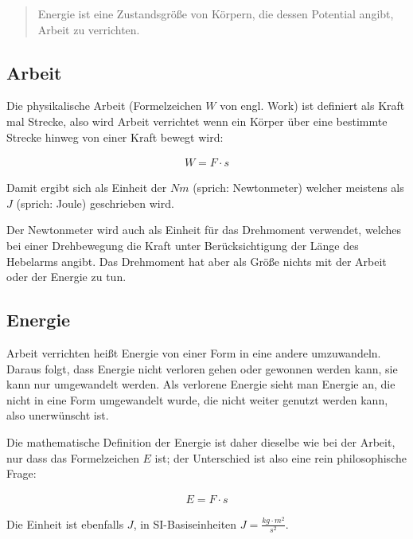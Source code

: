 \begin{quote}
\glqq Energie ist eine Zustandsgröße von Körpern, die dessen Potential angibt, Arbeit zu verrichten.\grqq
\end{quote}

\subsection{Arbeit}

Die physikalische \glqq Arbeit\grqq{} (Formelzeichen $W$ von engl. \glqq Work\grqq ) ist definiert als Kraft mal Strecke, also wird Arbeit verrichtet wenn ein Körper über eine bestimmte Strecke hinweg von einer Kraft bewegt wird:

\begin{align}
	W = F \cdot s
\end{align}

\noindent Damit ergibt sich als Einheit der $Nm$ (sprich: \glqq Newtonmeter\grqq ) welcher meistens als $J$ (sprich: \glqq Joule\grqq ) geschrieben wird.

\begin{Anmerkung}
Der Newtonmeter wird auch als Einheit für das Drehmoment verwendet, welches bei einer Drehbewegung die Kraft unter Berücksichtigung der Länge des Hebelarms angibt. Das Drehmoment hat aber als Größe nichts mit der Arbeit oder der Energie zu tun.
\end{Anmerkung}


\subsection{Energie}

\glqq Arbeit verrichten\grqq{} heißt Energie von einer Form in eine andere umzuwandeln. Daraus folgt, dass Energie nicht verloren gehen oder gewonnen werden kann, sie kann nur umgewandelt werden. Als \glqq verlorene Energie\grqq{} sieht man Energie an, die nicht in eine Form umgewandelt wurde, die nicht weiter genutzt werden kann, also unerwünscht ist.

Die mathematische Definition der Energie ist daher dieselbe wie bei der Arbeit, nur dass das Formelzeichen $E$ ist; der Unterschied ist also eine rein philosophische Frage:

\begin{align}	\label{eq:energiedef}
	E = F \cdot s
\end{align}

\noindent Die Einheit ist ebenfalls $J$, in SI-Basiseinheiten $J=\frac{kg \cdot m^2}{s^2}$.


